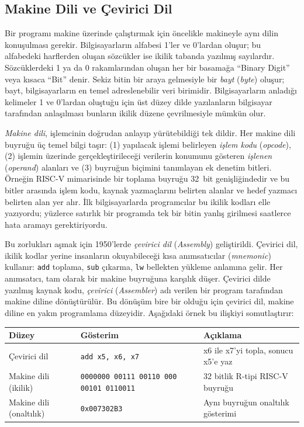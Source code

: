\subsection{Makine Dili ve Çevirici Dil}
\label{subsec:makine-dili-cevirici}

Bir programı makine üzerinde çalıştırmak için öncelikle makineyle aynı dilin konuşulması gerekir. Bilgisayarların alfabesi 1'ler ve 0'lardan oluşur; bu alfabedeki harflerden oluşan sözcükler ise ikilik tabanda yazılmış sayılardır. Sözcüklerdeki 1 ya da 0 rakamlarından oluşan her bir basamağa ``Binary Digit'' veya kısaca ``Bit'' denir. Sekiz bitin bir araya gelmesiyle bir \emph{bayt} (\emph{byte}) oluşur; bayt, bilgisayarların en temel adreslenebilir veri birimidir. Bilgisayarların anladığı kelimeler 1 ve 0'lardan oluştuğu için üst düzey dilde yazılanların bilgisayar tarafından anlaşılması bunların ikilik düzene çevrilmesiyle mümkün olur.

\emph{Makine dili}, işlemcinin doğrudan anlayıp yürütebildiği tek dildir. Her makine dili buyruğu üç temel bilgi taşır: (1) yapılacak işlemi belirleyen \emph{işlem kodu} (\emph{opcode}), (2) işlemin üzerinde gerçekleştirileceği verilerin konumunu gösteren \emph{işlenen} (\emph{operand}) alanları ve (3) buyruğun biçimini tanımlayan ek denetim bitleri. Örneğin RISC-V mimarisinde bir toplama buyruğu 32~bit genişliğindedir ve bu bitler arasında işlem kodu, kaynak yazmaçlarını belirten alanlar ve hedef yazmacı belirten alan yer alır. İlk bilgisayarlarda programcılar bu ikilik kodları elle yazıyordu; yüzlerce satırlık bir programda tek bir bitin yanlış girilmesi saatlerce hata aramayı gerektiriyordu.

Bu zorlukları aşmak için 1950'lerde \emph{çevirici dil} (\emph{Assembly}) geliştirildi. Çevirici dil, ikilik kodlar yerine insanların okuyabileceği kısa anımsatıcılar (\emph{mnemonic}) kullanır: \texttt{add} toplama, \texttt{sub} çıkarma, \texttt{lw} bellekten yükleme anlamına gelir. Her anımsatıcı, tam olarak bir makine buyruğuna karşılık düşer. Çevirici dilde yazılmış kaynak kodu, \emph{çevirici} (\emph{Assembler}) adı verilen bir program tarafından makine diline dönüştürülür. Bu dönüşüm bire bir olduğu için çevirici dil, makine diline en yakın programlama düzeyidir. Aşağıdaki örnek bu ilişkiyi somutlaştırır:

\begin{center}
\footnotesize
\begin{tabular}{@{}lll@{}}
\toprule
\textbf{Düzey} & \textbf{Gösterim} & \textbf{Açıklama} \\
\midrule
Çevirici dil & \texttt{add x5, x6, x7} & x6 ile x7'yi topla, sonucu x5'e yaz \\
Makine dili (ikilik) & \texttt{0000000\,00111\,00110\,000\,00101\,0110011} & 32 bitlik R-tipi RISC-V buyruğu \\
Makine dili (onaltılık) & \texttt{0x007302B3} & Aynı buyruğun onaltılık gösterimi \\
\bottomrule
\end{tabular}
\end{center}

